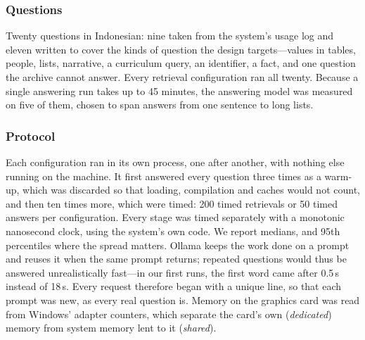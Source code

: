 \documentclass[conference]{IEEEtran}
\begin{document}
\subsubsection{Questions}
Twenty questions in Indonesian: nine taken from the system's usage log and
eleven written to cover the kinds of question the design targets---values in
tables, people, lists, narrative, a curriculum query, an identifier, a fact, and
one question the archive cannot answer. Every retrieval configuration ran all
twenty. Because a single answering run takes up to 45 minutes, the answering
model was measured on five of them, chosen to span answers from one sentence
to long lists.

\subsubsection{Protocol}
Each configuration ran in its own process, one after another, with nothing
else running on the machine. It first answered every question three times as
a warm-up, which was discarded so that loading, compilation and caches would
not count, and then ten times more, which were timed: 200 timed retrievals or
50 timed answers per configuration. Every stage was timed separately with a
monotonic nanosecond clock, using the system's own code. We report medians, and
95th percentiles where the spread matters. Ollama keeps the work done on a
prompt and reuses it when the same prompt returns; repeated questions would
thus be answered unrealistically fast---in our first runs, the first word came
after 0.5\,s instead of 18\,s. Every request therefore began with a unique
line, so that each prompt was new, as every real question is. Memory on the
graphics card was read from Windows' adapter counters, which separate the
card's own (\emph{dedicated}) memory from system memory lent to it
(\emph{shared}).
\end{document}
